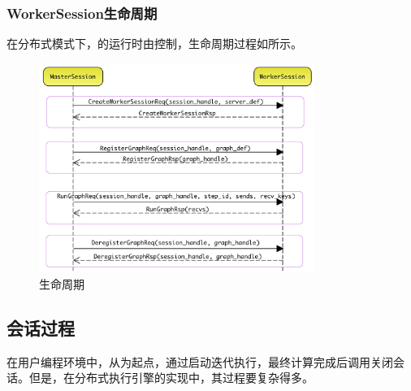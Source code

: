 \begin{content}
\begin{content}
\begin{content}
\subsubsection{WorkerSession生命周期}

在分布式模式下，的运行时由控制，生命周期过程如所示。

\begin{figure}[H]
\centering
\includegraphics[width=0.8\textwidth]{figures/dist-worker-session-life-cycle.png}
\caption{生命周期}
 \label{fig:dist-worker-session-life-cycle}
\end{figure}

\subsection{会话过程}

在用户编程环境中，从为起点，通过启动迭代执行，最终计算完成后调用关闭会话。但是，在分布式执行引擎的实现中，其过程要复杂得多。

\begin{nitemize}
    \begin{enum}
    \end{enum}
    \begin{enum}
    \end{enum}      
    \begin{enum}          
    \end{enum}  
\end{nitemize}


\end{content}
\end{content}
\end{content}
